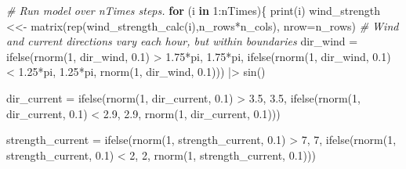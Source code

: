 \documentclass[
]{article}
\newenvironment{Shaded}{\begin{snugshade}}{\end{snugshade}}
\newcommand{\AttributeTok}[1]{\textcolor[rgb]{0.77,0.63,0.00}{#1}}
\newcommand{\CommentTok}[1]{\textcolor[rgb]{0.56,0.35,0.01}{\textit{#1}}}
\newcommand{\ControlFlowTok}[1]{\textcolor[rgb]{0.13,0.29,0.53}{\textbf{#1}}}
\newcommand{\DecValTok}[1]{\textcolor[rgb]{0.00,0.00,0.81}{#1}}
\newcommand{\FloatTok}[1]{\textcolor[rgb]{0.00,0.00,0.81}{#1}}
\newcommand{\FunctionTok}[1]{\textcolor[rgb]{0.00,0.00,0.00}{#1}}
\newcommand{\NormalTok}[1]{#1}
\newcommand{\OtherTok}[1]{\textcolor[rgb]{0.56,0.35,0.01}{#1}}
\newcommand{\SpecialCharTok}[1]{\textcolor[rgb]{0.00,0.00,0.00}{#1}}
\begin{document}
\begin{Shaded}
\begin{Highlighting}[]
  \CommentTok{\# Run model over nTimes steps.}
  \ControlFlowTok{for}\NormalTok{ (i }\ControlFlowTok{in} \DecValTok{1}\SpecialCharTok{:}\NormalTok{nTimes)\{}
    \FunctionTok{print}\NormalTok{(i)}
\NormalTok{    wind\_strength }\OtherTok{\textless{}\textless{}{-}} \FunctionTok{matrix}\NormalTok{(}\FunctionTok{rep}\NormalTok{(}\FunctionTok{wind\_strength\_calc}\NormalTok{(i),n\_rows}\SpecialCharTok{*}\NormalTok{n\_cols), }
                             \AttributeTok{nrow=}\NormalTok{n\_rows)}
    \CommentTok{\# Wind and current directions vary each hour, but within boundaries}
\NormalTok{    dir\_wind }\OtherTok{=} \FunctionTok{ifelse}\NormalTok{(}\FunctionTok{rnorm}\NormalTok{(}\DecValTok{1}\NormalTok{, dir\_wind, }\FloatTok{0.1}\NormalTok{) }\SpecialCharTok{\textgreater{}} \FloatTok{1.75}\SpecialCharTok{*}\NormalTok{pi, }\FloatTok{1.75}\SpecialCharTok{*}\NormalTok{pi, }
                      \FunctionTok{ifelse}\NormalTok{(}\FunctionTok{rnorm}\NormalTok{(}\DecValTok{1}\NormalTok{, dir\_wind, }\FloatTok{0.1}\NormalTok{) }\SpecialCharTok{\textless{}} \FloatTok{1.25}\SpecialCharTok{*}\NormalTok{pi, }\FloatTok{1.25}\SpecialCharTok{*}\NormalTok{pi,}
                             \FunctionTok{rnorm}\NormalTok{(}\DecValTok{1}\NormalTok{, dir\_wind, }\FloatTok{0.1}\NormalTok{))) }\SpecialCharTok{|\textgreater{}} \FunctionTok{sin}\NormalTok{()}
    
    
\NormalTok{    dir\_current }\OtherTok{=} \FunctionTok{ifelse}\NormalTok{(}\FunctionTok{rnorm}\NormalTok{(}\DecValTok{1}\NormalTok{, dir\_current, }\FloatTok{0.1}\NormalTok{) }\SpecialCharTok{\textgreater{}} \FloatTok{3.5}\NormalTok{, }\FloatTok{3.5}\NormalTok{, }
                         \FunctionTok{ifelse}\NormalTok{(}\FunctionTok{rnorm}\NormalTok{(}\DecValTok{1}\NormalTok{, dir\_current, }\FloatTok{0.1}\NormalTok{) }\SpecialCharTok{\textless{}} \FloatTok{2.9}\NormalTok{, }\FloatTok{2.9}\NormalTok{,}
                                \FunctionTok{rnorm}\NormalTok{(}\DecValTok{1}\NormalTok{, dir\_current, }\FloatTok{0.1}\NormalTok{)))}
    
\NormalTok{    strength\_current }\OtherTok{=} \FunctionTok{ifelse}\NormalTok{(}\FunctionTok{rnorm}\NormalTok{(}\DecValTok{1}\NormalTok{, strength\_current, }\FloatTok{0.1}\NormalTok{) }\SpecialCharTok{\textgreater{}} \DecValTok{7}\NormalTok{, }\DecValTok{7}\NormalTok{, }
                              \FunctionTok{ifelse}\NormalTok{(}\FunctionTok{rnorm}\NormalTok{(}\DecValTok{1}\NormalTok{, strength\_current, }\FloatTok{0.1}\NormalTok{) }\SpecialCharTok{\textless{}} \DecValTok{2}\NormalTok{, }\DecValTok{2}\NormalTok{,}
                                     \FunctionTok{rnorm}\NormalTok{(}\DecValTok{1}\NormalTok{, strength\_current, }\FloatTok{0.1}\NormalTok{)))}
    

\end{Highlighting}
\end{Shaded}
\end{document}
